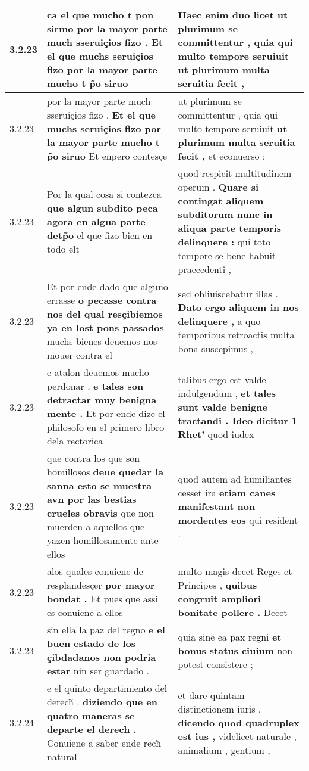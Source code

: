\begin{tabular}{|p{1cm}|p{6.5cm}|p{6.5cm}|}
3.2.23 & ca el que mucho t pon sirmo \textbf{ por la mayor parte much sseruiçios fizo . } Et el que muchs seruiçios fizo por la mayor parte mucho t p̃o siruo & Haec enim duo licet \textbf{ ut plurimum se committentur , quia qui multo tempore seruiuit } ut plurimum multa seruitia fecit , \\\hline
3.2.23 & por la mayor parte much sseruiçios fizo . \textbf{ Et el que muchs seruiçios fizo por la mayor parte mucho t p̃o siruo } Et enpero contesçe & ut plurimum se committentur , quia qui multo tempore seruiuit \textbf{ ut plurimum multa seruitia fecit , } et econuerso ; \\\hline
3.2.23 & Por la qual cosa si contezca \textbf{ que algun subdito peca agora en algua parte detp̃o } el que fizo bien en todo elt & quod respicit multitudinem operum . \textbf{ Quare si contingat aliquem subditorum nunc in aliqua parte temporis delinquere : } qui toto tempore se bene habuit praecedenti , \\\hline
3.2.23 & Et por ende dado que alguno errasse \textbf{ o pecasse contra nos del qual resçibiemos ya en lost pons passados } muchs bienes deuemos nos mouer contra el & sed obliuiscebatur illas . \textbf{ Dato ergo aliquem in nos delinquere , } a quo temporibus retroactis multa bona suscepimus , \\\hline
3.2.23 & e atalon deuemos mucho perdonar . \textbf{ e tales son detractar muy benigna mente . } Et por ende dize el philosofo en el primero libro dela rectorica & talibus ergo est valde indulgendum , \textbf{ et tales sunt valde benigne tractandi . Ideo dicitur 1 Rhet’ } quod iudex \\\hline
3.2.23 & que contra los que son homillosos \textbf{ deue quedar la sanna esto se muestra avn por las bestias crueles obravis } que non muerden a aquellos que yazen homillosamente ante ellos & quod autem ad humiliantes cesset ira \textbf{ etiam canes manifestant non mordentes eos } qui resident . \\\hline
3.2.23 & alos quales conuiene de resplandesçer \textbf{ por mayor bondat . } Et pues que assi es conuiene a ellos & multo magis decet Reges et Principes , \textbf{ quibus congruit ampliori bonitate pollere . } Decet \\\hline
3.2.23 & sin ella la paz del regno \textbf{ e el buen estado de los çibdadanos non podria estar } nin ser guardado . & quia sine ea pax regni \textbf{ et bonus status ciuium } non potest consistere ; \\\hline
3.2.24 & e el quinto departimiento del derech̃ . \textbf{ diziendo que en quatro maneras se departe el derech . } Conuiene a saber ende recħ natural & et dare quintam distinctionem iuris , \textbf{ dicendo quod quadruplex est ius , } videlicet naturale , animalium , gentium , \\\hline

\end{tabular}
